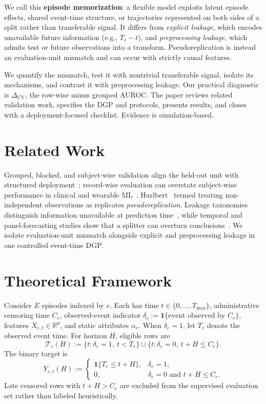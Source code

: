 \documentclass[runningheads]{llncs}
\newcommand{\1}{\mathbf{1}}
\newcommand{\DeltaCV}{\Delta_{\text{CV}}}
\begin{document}
We call this \textbf{episode memorization}: a flexible model exploits latent episode effects, shared event-time structure, or trajectories represented on both sides of a split rather than transferable signal. It differs from \emph{explicit leakage}, which encodes unavailable future information (e.g., $T_e-t$), and \emph{preprocessing leakage}, which admits test or future observations into a transform. Pseudoreplication is instead an evaluation-unit mismatch and can occur with strictly causal features.

We quantify the mismatch, test it with nontrivial transferable signal, isolate its mechanisms, and contrast it with preprocessing leakage. Our practical diagnostic is $\DeltaCV$, the row-wise minus grouped AUROC. The paper reviews related validation work, specifies the DGP and protocols, presents results, and closes with a deployment-focused checklist. Evidence is simulation-based.

\section{Related Work}\label{sec:related}

Grouped, blocked, and subject-wise validation align the held-out unit with structured deployment~\cite{roberts2017,prado2018}; record-wise evaluation can overstate subject-wise performance in clinical and wearable ML~\cite{saeb2017,vabalas2019}. Hurlbert~\cite{hurlbert1984} termed treating non-independent observations as replicates \emph{pseudoreplication}. Leakage taxonomies distinguish information unavailable at prediction time~\cite{kaufman2012,kapoor2023}, while temporal and panel-forecasting studies show that a splitter can overturn conclusions~\cite{cranmer2017,neunhoeffer2019}. We isolate evaluation-unit mismatch alongside explicit and preprocessing leakage in one controlled event-time DGP.

\section{Theoretical Framework}\label{sec:theory}

Consider $E$ episodes indexed by $e$. Each has time $t \in \{0,\ldots,T_{\max}\}$, administrative censoring time $C_e$, observed-event indicator $\delta_e := \1\{\text{event observed by } C_e\}$, features $X_{e,t} \in \mathbb{R}^p$, and static attributes $\alpha_e$. When $\delta_e = 1$, let $T_e$ denote the observed event time. For horizon $H$, eligible rows are
\[
\mathcal{T}_e(H)
:=
\{t : \delta_e = 1,\ t < T_e\}
\cup
\{t : \delta_e = 0,\ t + H \leq C_e\}.
\]
The binary target is
\[
Y_{e,t}(H)
:=
\begin{cases}
\1\{T_e \leq t + H\}, & \delta_e = 1, \\
0, & \delta_e = 0 \text{ and } t + H \leq C_e.
\end{cases}
\]
Late censored rows with $t + H > C_e$ are excluded from the supervised evaluation set rather than labeled heuristically.
\end{document}
